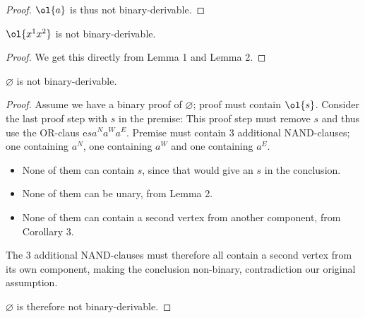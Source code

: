 \begin{proof}
  $\ol{a}$ is thus not binary-derivable.

\end{proof}

\begin{corollary}
  $\ol{x^1x^2}$ is not binary-derivable.
  \label{thm:non_binary_derivable_uv}
\end{corollary}

\begin{proof}
  We get this directly from Lemma 1 and Lemma 2.
\end{proof}

\begin{theorem}
  $\varnothing$ is not binary-derivable.
  \label{thm:non_binary_derivable_paradox}
\end{theorem}

\begin{proof}
  Assume we have a binary proof of $\varnothing$;
  proof must contain $\ol{s}$.
  Consider the last proof step with $s$ in the premise:
  This proof step must remove $s$ and thus use the OR-claus e$sa^Na^Wa^E$.
  Premise must contain 3 additional NAND-clauses;
  one containing $a^N$, one containing $a^W$ and one containing $a^E$.
  \begin{itemize}
    \item None of them can contain $s$, since that would give an $s$ in the conclusion.
    \item None of them can be unary, from Lemma 2.
    \item None of them can contain a second vertex from another component, from Corollary 3.
  \end{itemize}
  The 3 additional NAND-clauses must therefore all contain a second vertex from its own component,
  making the conclusion non-binary, contradiction our original assumption.

  $\varnothing$ is therefore not binary-derivable.
\end{proof}

